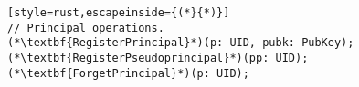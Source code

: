 \begin{figure}[t]
\begin{lstlisting}[style=rust,escapeinside={(*}{*)}]
// Principal operations.
(*\textbf{RegisterPrincipal}*)(p: UID, pubk: PubKey);
(*\textbf{RegisterPseudoprincipal}*)(pp: UID);
(*\textbf{ForgetPrincipal}*)(p: UID);


\end{lstlisting}
\end{figure}
